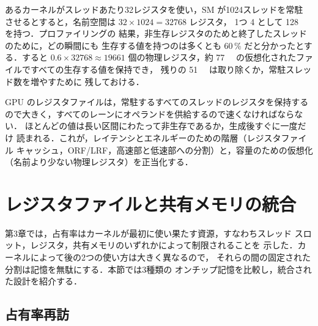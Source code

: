\documentclass[../main.tex]{subfiles}
\begin{document}
\begin{example}
  \label{ex:l06-rf-virtualization}
  あるカーネルがスレッドあたり32レジスタを使い，SM が1024スレッドを常駐
  させるとすると，名前空間は $32 \times 1024 = \num{32768}$ レジスタ，
  1つ \SI{4}{\byte} として \SI{128}{\kibi\byte} を持つ．プロファイリングの
  結果，非生存レジスタのためと終了したスレッドのために，どの瞬間にも
  生存する値を持つのは多くとも 60\,\% だと分かったとする．すると
  $0.6 \times \num{32768} \approx \num{19661}$ 個の物理レジスタ，約
  \SI{77}{\kibi\byte} の仮想化されたファイルですべての生存する値を保持でき，
  残りの \SI{51}{\kibi\byte} は取り除くか，常駐スレッド数を増やすために
  残しておける．
\end{example}

\begin{keypoint}
  GPU のレジスタファイルは，常駐するすべてのスレッドのレジスタを保持する
  ので大きく，すべてのレーンにオペランドを供給するので速くなければならない．
  ほとんどの値は長い区間にわたって非生存であるか，生成後すぐに一度だけ
  読まれる．これが，レイテンシとエネルギーのための階層（レジスタファイル
  キャッシュ，ORF/LRF，高速部と低速部への分割）と，容量のための仮想化
  （名前より少ない物理レジスタ）を正当化する．
\end{keypoint}

\section{レジスタファイルと共有メモリの統合}
\label{sec:l06-unified}

第3章では，占有率はカーネルが最初に使い果たす資源，すなわちスレッド
スロット，レジスタ，共有メモリのいずれかによって制限されることを
示した．カーネルによって後の2つの使い方は大きく異なるので，
それらの間の固定された分割は記憶を無駄にする．本節では3種類の
オンチップ記憶を比較し，統合された設計を紹介する．

\subsection{占有率再訪}
\end{document}
